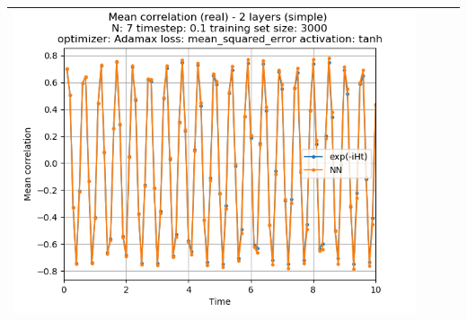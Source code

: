 \documentclass{article}
\begin{document}
\begin{tabular}{|c|c|c|c|}
     \includegraphics[scale=0.37]{./Searching_for_good_train_set_size/2_layers_simple_train_samples=3000_timestep=0.1_t_total=10.0_optimizer=Adamax_loss=mean_squared_error_activation=tanh/Corr_N=7_(real).png} \\ \hline


\end{tabular}
\end{document}
